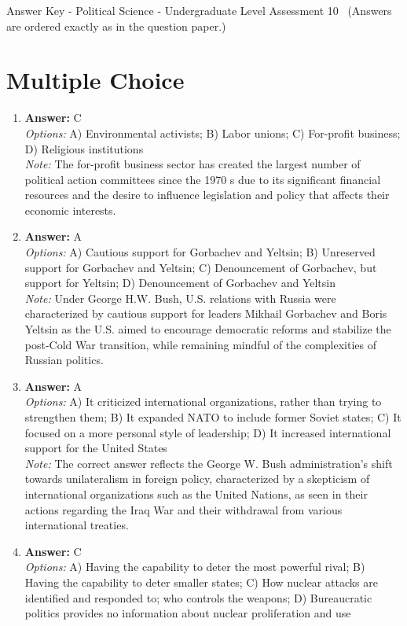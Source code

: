 \documentclass[12pt]{article}
\begin{document}
\begin{center}
Answer Key - Political Science - Undergraduate Level Assessment 10 \
\small (Answers are ordered exactly as in the question paper.)
\end{center}

\section*{Multiple Choice}
\begin{enumerate}[label=\arabic*.]
\item \textbf{Answer:} C
\\ \textit{Options:} A) Environmental activists; B) Labor unions; C) For-profit business; D) Religious institutions
\\ \textit{Note:} The for-profit business sector has created the largest number of political action committees since the 1970 s due to its significant financial resources and the desire to influence legislation and policy that affects their economic interests.
\item \textbf{Answer:} A
\\ \textit{Options:} A) Cautious support for Gorbachev and Yeltsin; B) Unreserved support for Gorbachev and Yeltsin; C) Denouncement of Gorbachev, but support for Yeltsin; D) Denouncement of Gorbachev and Yeltsin
\\ \textit{Note:} Under George H.W. Bush, U.S. relations with Russia were characterized by cautious support for leaders Mikhail Gorbachev and Boris Yeltsin as the U.S. aimed to encourage democratic reforms and stabilize the post-Cold War transition, while remaining mindful of the complexities of Russian politics.
\item \textbf{Answer:} A
\\ \textit{Options:} A) It criticized international organizations, rather than trying to strengthen them; B) It expanded NATO to include former Soviet states; C) It focused on a more personal style of leadership; D) It increased international support for the United States
\\ \textit{Note:} The correct answer reflects the George W. Bush administration's shift towards unilateralism in foreign policy, characterized by a skepticism of international organizations such as the United Nations, as seen in their actions regarding the Iraq War and their withdrawal from various international treaties.
\item \textbf{Answer:} C
\\ \textit{Options:} A) Having the capability to deter the most powerful rival; B) Having the capability to deter smaller states; C) How nuclear attacks are identified and responded to; who controls the weapons; D) Bureaucratic politics provides no information about nuclear proliferation and use

\end{enumerate}
\end{document}
